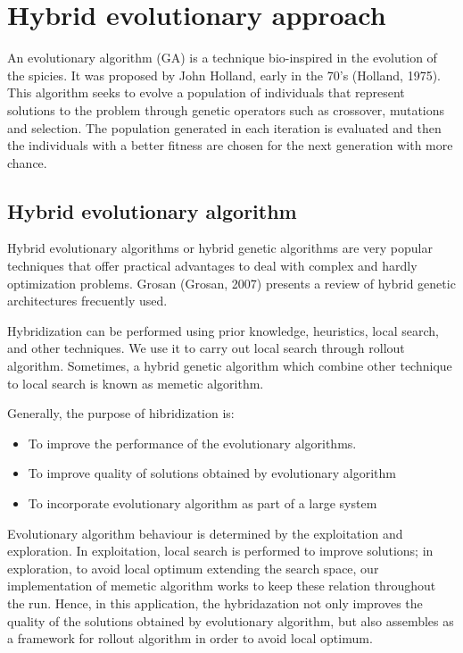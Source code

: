 \chapter{Hybrid evolutionary approach}
\label{chap:methodology}

An evolutionary algorithm (GA) is a technique bio-inspired in the evolution of the spicies. It was proposed by John Holland, early in the 70's (Holland, 1975). This algorithm seeks to evolve a population of individuals that represent solutions to the problem through genetic operators such as crossover, mutations and selection. The population generated in each iteration is evaluated and then the individuals with a better fitness are chosen for the next generation with more chance.

\section{Hybrid evolutionary algorithm}

Hybrid evolutionary algorithms or hybrid genetic algorithms are very popular techniques that offer practical advantages to deal with complex and hardly optimization problems. Grosan (Grosan, 2007) presents a review of hybrid genetic architectures frecuently used. 

Hybridization can be performed using prior knowledge, heuristics, local search, and other techniques. We use it to carry out local search through rollout algorithm. Sometimes, a hybrid genetic algorithm which combine other technique to local search is known as memetic algorithm.

Generally, the purpose of hibridization is:

\begin{itemize}
 \item To improve the performance of the evolutionary algorithms.
 \item To improve quality of solutions obtained by evolutionary algorithm
 \item To incorporate evolutionary algorithm as part of a large system
\end{itemize}

Evolutionary algorithm behaviour is determined by the exploitation and exploration. In exploitation, local search is performed to improve solutions; in exploration, to avoid local optimum extending the search space, our implementation of memetic algorithm works to keep these relation throughout the run. Hence, in this application, the hybridazation not only improves the quality of the solutions obtained by evolutionary algorithm, but also  assembles as a framework for rollout algorithm in order to avoid local optimum.


